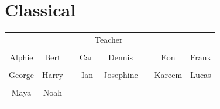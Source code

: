 \documentclass[landscape,a5paper]{article}
\begin{document}
\section{Classical}
\begin{table}[ht]
\centering
\begin{tabular}{cccccccc}
\cline{3-6} &  & \multicolumn{4}{|c|}{Teacher} &  & \\\cline{3-6}\\\cline{1-2} \cline{4-5} \cline{7-8}
\multicolumn{1}{|c|}{Alphie} & \multicolumn{1}{|c|}{Bert} &  & \multicolumn{1}{|c|}{Carl} & \multicolumn{1}{|c|}{Dennis} &  & \multicolumn{1}{|c|}{Eon} & \multicolumn{1}{|c|}{Frank}\\\cline{1-2} \cline{4-5} \cline{7-8}
 &  &  &  &  &  &  & \\\cline{1-2} \cline{4-5} \cline{7-8}
\multicolumn{1}{|c|}{George} & \multicolumn{1}{|c|}{Harry} &  & \multicolumn{1}{|c|}{Ian} & \multicolumn{1}{|c|}{Josephine} &  & \multicolumn{1}{|c|}{Kareem} & \multicolumn{1}{|c|}{Lucas}\\\cline{1-2} \cline{4-5} \cline{7-8}
 &  &  &  &  &  &  & \\\cline{1-2} \cline{4-5} \cline{7-8}
\multicolumn{1}{|c|}{Maya} & \multicolumn{1}{|c|}{Noah} &  & \multicolumn{1}{|c|}{} & \multicolumn{1}{|c|}{} &  & \multicolumn{1}{|c|}{} & \multicolumn{1}{|c|}{}\\\cline{1-2} \cline{4-5} \cline{7-8}
 &  &  &  &  &  &  & \\
\end{tabular}
\end{table}
\end{document}
